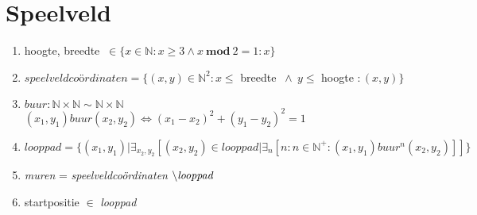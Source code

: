 \section{Speelveld}\label{sec:speelveld} %


\begin{enumerate}

 \item hoogte, breedte $ ~ \in \{ x \in \mathbb{N} : x \geq 3 \wedge x~
       \textbf{mod} ~2 = 1: x \}$
 \item $speelveldco$\"o$rdinaten = \{ (x,y) \in \mathbb{N}^2 : x
\leq$ breedte $ ~ \wedge ~ y \leq $ hoogte $ : (x,y) \} $
 \item $buur: \mathbb{N} \times \mathbb{N} \sim \mathbb{N} \times \mathbb{N} $ \\
       $(x_{1},y_{1})buur(x_{2},y_{2}) \Leftrightarrow (x_{1} - x_{2})^2 + (y_{1} - y_{2})^2 = 1$
\item $looppad =  \{ (x_{1}, y_{1}) | \exists _{x_{2}, y_{2}} [ (x_{2}, y_{2}) \in looppad | \exists _{n} [ n : n \in \mathbb{N}^+ : (x_{1},y_{1})buur^n(x_{2},y_{2}) ] ] \} $
 \item \emph{muren} = \emph{speelveldco\"ordinaten} $\setminus \emph{looppad}$
 \item startpositie $\in$ \emph{looppad}
\end{enumerate}
